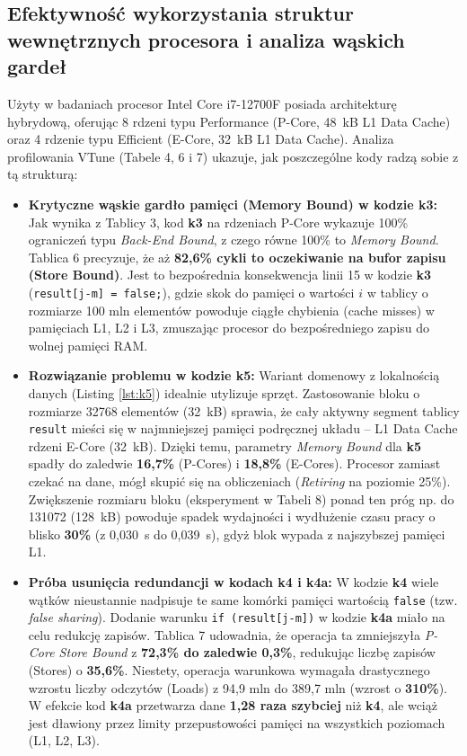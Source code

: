 \documentclass[10pt]{article}
\begin{document}
\subsection{Efektywność wykorzystania struktur wewnętrznych procesora i analiza wąskich gardeł}
Użyty w badaniach procesor Intel Core i7-12700F posiada architekturę hybrydową, oferując 8 rdzeni typu Performance (P-Core, 48~kB L1 Data Cache) oraz 4 rdzenie typu Efficient
 (E-Core, 32~kB L1 Data Cache). Analiza profilowania VTune (Tabele 4, 6 i 7) ukazuje, jak poszczególne kody radzą sobie z tą strukturą:

\begin{itemize}
    \item \textbf{Krytyczne wąskie gardło pamięci (Memory Bound) w kodzie k3:} Jak wynika z Tablicy 3, kod \textbf{k3} na rdzeniach P-Core wykazuje 100\% ograniczeń typu \textit{Back-End Bound},
	 z czego równe 100\% to \textit{Memory Bound}. Tablica 6 precyzuje, że aż \textbf{82,6\% cykli to oczekiwanie na bufor zapisu (Store Bound)}. Jest to bezpośrednia konsekwencja linii 15 w 
	 kodzie \textbf{k3} (\texttt{result[j-m] = false;}), gdzie skok do pamięci o wartości $i$ w tablicy o rozmiarze 100 mln elementów powoduje ciągłe chybienia (cache misses) w
	  pamięciach L1, L2 i L3, zmuszając procesor do bezpośredniego zapisu do wolnej pamięci RAM.
    \item \textbf{Rozwiązanie problemu w kodzie k5:} Wariant domenowy z lokalnością danych (Listing \ref{lst:k5}) idealnie utylizuje sprzęt. Zastosowanie bloku o rozmiarze 32768 elementów (32~kB) 
	sprawia, że cały aktywny segment tablicy \texttt{result} mieści się w najmniejszej pamięci podręcznej układu – L1 Data Cache rdzeni E-Core (32~kB). Dzięki temu, parametry \textit{Memory Bound} 
	dla \textbf{k5} spadły do zaledwie \textbf{16,7\%} (P-Cores) i \textbf{18,8\%} (E-Cores). Procesor zamiast czekać na dane, mógł skupić się na obliczeniach (\textit{Retiring} na poziomie 25\%).
	 Zwiększenie rozmiaru bloku (eksperyment w Tabeli 8) ponad ten próg np. do 131072 (128~kB) powoduje spadek wydajności i wydłużenie czasu pracy o blisko \textbf{30\%} (z 0,030~s do 0,039~s),
	  gdyż blok wypada z najszybszej pamięci L1.
    \item \textbf{Próba usunięcia redundancji w kodach k4 i k4a:} W kodzie \textbf{k4} wiele wątków nieustannie nadpisuje te same komórki pamięci wartością \texttt{false} 
	(tzw. \textit{false sharing}). Dodanie warunku \texttt{if (result[j-m])} w kodzie \textbf{k4a} miało na celu redukcję zapisów. Tablica 7 udowadnia, że operacja ta zmniejszyła 
	\textit{P-Core Store Bound} z \textbf{72,3\% do zaledwie 0,3\%}, redukując liczbę zapisów (Stores) o \textbf{35,6\%}. Niestety, operacja warunkowa wymagała drastycznego wzrostu 
	liczby odczytów (Loads) z 94,9 mln do 389,7 mln (wzrost o \textbf{310\%}). W efekcie kod \textbf{k4a} przetwarza dane \textbf{1,28 raza szybciej} niż \textbf{k4}, ale wciąż jest 
	dławiony przez limity przepustowości pamięci na wszystkich poziomach (L1, L2, L3).
\end{itemize}
\end{document}
